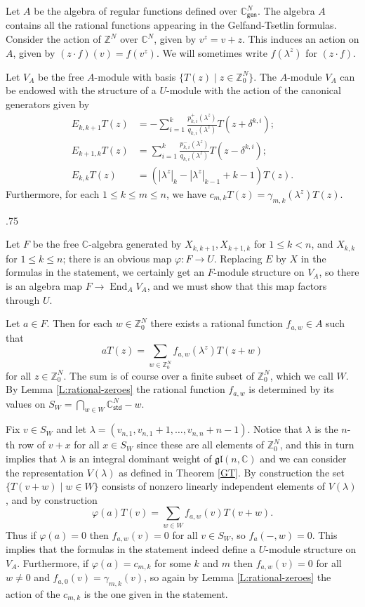 \documentclass[11pt,fleqn]{article}
\makeatletter
\newcounter{para}[section]
\renewenvironment{proof}[1][\textit{Proof}]{\par
  \pushQED{\qed}%
  \normalfont \topsep.75\paraskip\relax
  \trivlist
  \item[\hskip\labelsep
        \itshape
    #1\@addpunct{.}]\ignorespaces
}{%
  \popQED\endtrivlist\@endpefalse
}
\newcommand\CC{\mathbb C}
\newcommand\ZZ{\mathbb Z}
\renewcommand\to{\longrightarrow}
\renewcommand\phi{\varphi}
\newcommand\gl{\mathfrak{gl}}
\newcommand\gen{\mathsf{gen}}
\newcommand\std{\mathsf{std}}
\DeclareMathOperator\End{End}
\makeatother
\begin{document}
Let $A$ be the algebra of regular functions defined over $\CC^N_\gen$. The 
algebra $A$ contains all the rational functions appearing in the 
Gelfand-Tsetlin formulas. Consider the action of $\ZZ^N$ over $\CC^N$, given 
by $v^z = v+z$. This induces an action on $A$, given by $(z \cdot f)(v) = 
f(v^z)$. We will sometimes write $f(\lambda^z)$ for $(z \cdot f)$. 

\begin{Proposition}
\label{P:universal-generic-GT-module}
Let $V_A$ be the free $A$-module with basis $\{T(z) \mid z \in \ZZ^N_0\}$.
The $A$-module $V_A$ can be endowed with the structure of a $U$-module 
with the action of the canonical generators given by
\begin{align*}
E_{k,k+1} T(z) 
	&= - \sum_{i=1}^k \frac{p^+_{k,i}(\lambda^z)}{q_{k,i}(\lambda^z)} 
		T(z + \delta^{k,i}); \\
E_{k+1,k} T(z) 
	&= \sum_{i=1}^k \frac{p^-_{k,i}(\lambda^z)}{q_{k,i}(\lambda^z)} 
		T(z - \delta^{k,i}); \\
E_{k,k} T(z)
	&= (|\lambda^z|_k - |\lambda^z|_{k-1} + k -1) T(z).
\end{align*}
Furthermore, for each $1 \leq k \leq m \leq n$, we have $c_{m,k} T(z) = 
\gamma_{m,k}(\lambda^z) T(z)$.
\end{Proposition}
\begin{proof}
Let $F$ be the free $\CC$-algebra generated by $X_{k,k+1}, X_{k+1,k}$ for 
$1 \leq k < n$, and $X_{k,k}$ for $1 \leq k \leq n$; there is an obvious map
$\phi: F \to U$. Replacing $E$ by $X$ in the formulas in the statement, we 
certainly get an $F$-module structure on $V_A$, so there is an algebra map $F 
\to \End_A V_A$, and we must show that this map factors through $U$.

Let $a \in F$. Then for each $w \in \ZZ^N_0$ there exists a rational function 
$f_{a,w} \in A$ such that
\[
	aT(z) = \sum_{w \in \ZZ^N_0} f_{a,w}(\lambda^z) T(z+w)
\]
for all $z \in \ZZ^N_0$. The sum is of course over a finite subset of 
$\ZZ^N_0$, which we call $W$. By Lemma \ref{L:rational-zeroes} the rational 
function $f_{a,w}$ is determined by its values on $S_W = \bigcap_{w \in W} 
\CC_\std^N-w$.

Fix $v \in S_W$ and let $\lambda = (v_{n,1}, v_{n,1} + 1, \ldots, v_{n,n} + 
n -1)$. Notice that $\lambda$ is the $n$-th row of $v+x$ for all $x \in S_W$ 
since these are all elements of $\ZZ^N_0$, and this in turn implies that 
$\lambda$ is an integral dominant weight of $\gl(n,\CC)$ and we can
consider the representation $V(\lambda)$ as defined in Theorem \ref{GT}. By 
construction the set $\{T(v+w) \mid w \in W\}$ consists of nonzero linearly 
independent elements of $V(\lambda)$, and by construction
\[
	\phi(a) T(v) = \sum_{w \in W} f_{a,w}(v) T(v+w).
\]
Thus if $\phi(a) = 0$ then $f_{a,w}(v) = 0$ for all $v \in S_W$, so $f_a(-,w) 
= 0$. This implies that the formulas in the statement indeed define a 
$U$-module structure on $V_A$. Furthermore, if $\phi(a) = c_{m,k}$ for
some $k$ and $m$ then $f_{a,w}(v) = 0$ for all $w \neq 0$ and $f_{a,0}(v) = 
\gamma_{m,k}(v)$, so again by Lemma \ref{L:rational-zeroes} the action of the
$c_{m,k}$ is the one given in the statement.
\end{proof}
\end{document}
